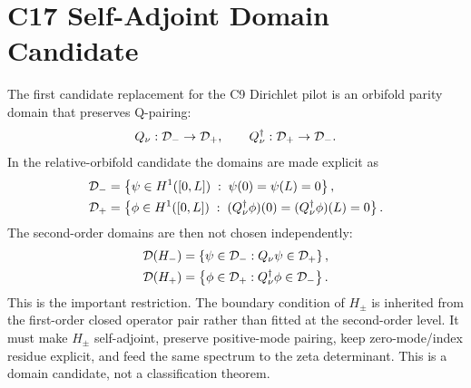 \documentclass[11pt]{article}
\begin{document}
\section{C17 Self-Adjoint Domain Candidate}
The first candidate replacement for the C9 Dirichlet pilot is an orbifold
parity domain that preserves Q-pairing:
\begin{equation}
Q_\nu:{\cal D}_-\to{\cal D}_+,\qquad
Q_\nu^\dagger:{\cal D}_+\to{\cal D}_- .
\end{equation}
In the relative-orbifold candidate the domains are made explicit as
\begin{align}
{\cal D}_-
&=\left\lbrace\psi\in H^1([0,L])\;:\;\psi(0)=\psi(L)=0\right\rbrace,\\
{\cal D}_+
&=\left\lbrace\phi\in H^1([0,L])\;:\;(Q_\nu^\dagger\phi)(0)
=(Q_\nu^\dagger\phi)(L)=0\right\rbrace.
\end{align}
The second-order domains are then not chosen independently:
\begin{align}
{\cal D}(H_-)&=\left\lbrace\psi\in{\cal D}_-:Q_\nu\psi\in{\cal D}_+\right\rbrace,\\
{\cal D}(H_+)&=\left\lbrace\phi\in{\cal D}_+:Q_\nu^\dagger\phi\in{\cal D}_-\right\rbrace.
\end{align}
This is the important restriction.  The boundary condition of $H_\pm$ is
inherited from the first-order closed operator pair rather than fitted at the
second-order level.  It must make $H_\pm$ self-adjoint, preserve positive-mode
pairing, keep zero-mode/index residue explicit, and feed the same spectrum to
the zeta determinant.  This is a domain candidate, not a classification
theorem.
\end{document}
